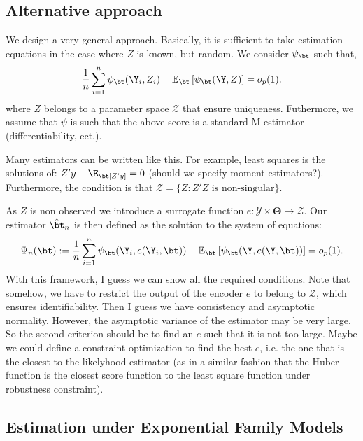 \subsection{Alternative approach}

We design a very general approach. Basically, it is sufficient to take estimation equations in the case where $Z$ is known, but random.
We consider $\psi_\bt$ such that,
\begin{equation}
\frac{1}{n} \sum_{i=1}^n \psi_\bt(\Y_i, Z_i) -
\mathbb{E}_\bt
\left[ 
\psi_\bt(\Y, Z ) 
\right] = o_p(1).
\end{equation}
where $Z$ belongs to a parameter space $\mathcal{Z}$ that ensure uniqueness.
Futhermore, we assume that $\psi$ is such that the above score is a standard M-estimator (differentiability, ect.).

Many estimators can be written like this. 
For example, least squares is the solutions of: $Z'y - \E_\bt[Z'y]= 0$ (should we specify moment estimators?).
Furthermore, the condition is that $\mathcal{Z}= \{ Z: Z'Z \text{ is non-singular} \}$.

As $Z$ is non observed we introduce a surrogate function
$e : \mathcal{Y} \times \bm{\Theta} \to \mathcal{Z}$.
Our estimator $\hat\bt_n$ is then defined as the solution to the system of equations:
\begin{equation}
\Psi_n(\bt) := \frac{1}{n} \sum_{i=1}^n \psi_\bt(\Y_i, e(\Y_i, \bt)) 
-
\mathbb{E}_\bt
\left[ 
\psi_\bt(\Y, e(\Y, \bt)) 
\right] = o_p(1).
\end{equation}
{\color{red} With this framework, I guess we can show all the required conditions.
Note that somehow, we have to restrict the output of the encoder $e$ to belong to $\mathcal{Z}$, which ensures identifiability.
}
Then I guess we have consistency and asymptotic normality.
However, the asymptotic variance of the estimator may be very large.
So the second criterion should be to find an $e$ such that it is not too large.
Maybe we could define a constraint optimization to find the best $e$, i.e. the one that is the closest to the likelyhood estimator (as in a similar fashion that the Huber function is the closest score function to the least square function under robustness constraint).


\subsection{Estimation under Exponential Family Models}
\label{sct:exponential-family}

